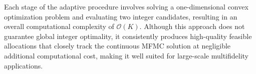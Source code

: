 Each stage of the adaptive procedure involves solving a one-dimensional convex optimization problem and evaluating two integer candidates, resulting in an overall computational complexity of $\mathcal{O}(K)$. Although this approach does not guarantee global integer optimality, it consistently produces high-quality feasible allocations that closely track the continuous MFMC solution at negligible additional computational cost, making it well suited for large-scale multifidelity applications.

























